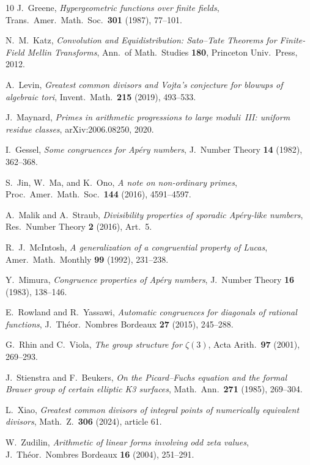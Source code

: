\documentclass[11pt]{article}
\theoremstyle{definition}
\theoremstyle{remark}
\begin{document}
\begin{thebibliography}{10}
J.~Greene,
\emph{Hypergeometric functions over finite fields},
Trans.\ Amer.\ Math.\ Soc.\ \textbf{301} (1987), 77--101.

N.~M.~Katz,
\emph{Convolution and Equidistribution:
Sato--Tate Theorems for Finite-Field Mellin Transforms},
Ann.\ of Math.\ Studies \textbf{180},
Princeton Univ.\ Press, 2012.

A.~Levin,
\emph{Greatest common divisors and Vojta's conjecture
for blowups of algebraic tori},
Invent.\ Math.\ \textbf{215} (2019), 493--533.

J.~Maynard,
\emph{Primes in arithmetic progressions to large moduli~III:
uniform residue classes},
arXiv:2006.08250, 2020.

I.~Gessel,
\emph{Some congruences for Ap\'ery numbers},
J.~Number Theory \textbf{14} (1982), 362--368.

S.~Jin, W.~Ma, and K.~Ono,
\emph{A note on non-ordinary primes},
Proc.\ Amer.\ Math.\ Soc.\ \textbf{144} (2016), 4591--4597.

A.~Malik and A.~Straub,
\emph{Divisibility properties of sporadic Ap\'ery-like numbers},
Res.\ Number Theory \textbf{2} (2016), Art.~5.

R.~J.~McIntosh,
\emph{A generalization of a congruential property of Lucas},
Amer.\ Math.\ Monthly \textbf{99} (1992), 231--238.

Y.~Mimura,
\emph{Congruence properties of Ap\'ery numbers},
J.~Number Theory \textbf{16} (1983), 138--146.

E.~Rowland and R.~Yassawi,
\emph{Automatic congruences for diagonals of rational functions},
J.~Th\'eor.\ Nombres Bordeaux \textbf{27} (2015), 245--288.

G.~Rhin and C.~Viola,
\emph{The group structure for $\zeta(3)$},
Acta Arith.\ \textbf{97} (2001), 269--293.

J.~Stienstra and F.~Beukers,
\emph{On the Picard--Fuchs equation and the formal Brauer
group of certain elliptic K3 surfaces},
Math.\ Ann.\ \textbf{271} (1985), 269--304.

L.~Xiao,
\emph{Greatest common divisors of integral points of
numerically equivalent divisors},
Math.\ Z.\ \textbf{306} (2024), article 61.

W.~Zudilin,
\emph{Arithmetic of linear forms involving odd zeta values},
J.~Th\'eor.\ Nombres Bordeaux \textbf{16} (2004), 251--291.
\end{thebibliography}








\end{document}
